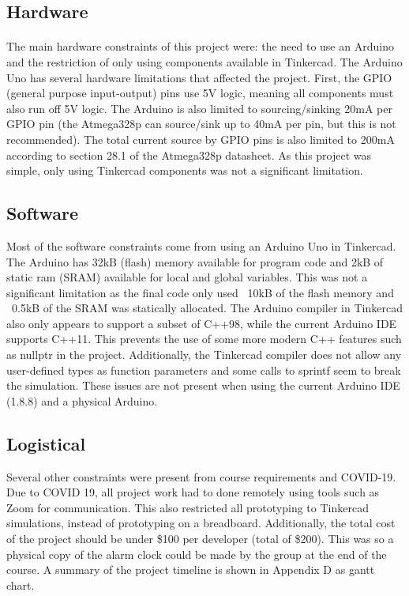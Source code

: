 \documentclass{article}
\begin{document}
\subsection{Hardware}
\paragraph{}
The main hardware constraints of this project were: the need to use an Arduino and the restriction of only using components available in Tinkercad. The Arduino Uno has several hardware limitations that affected the project. First, the GPIO (general purpose input-output) pins use 5V logic\cite{arduino}, meaning all components must also run off 5V logic. The Arduino is also limited to sourcing/sinking 20mA per GPIO pin\cite{arduino} (the Atmega328p can source/sink up to 40mA per pin\cite{atmega}, but this is not recommended). The total current source by GPIO pins is also limited to 200mA according to section 28.1 of the Atmega328p datasheet\cite{atmega}. As this project was simple, only using Tinkercad components was not a significant limitation.

\subsection{Software}
Most of the software constraints come from using an Arduino Uno in Tinkercad. The Arduino has 32kB (flash) memory available for program code and 2kB of static ram (SRAM) available for local and global variables\cite{arduino}. This was not a significant limitation as the final code only used ~10kB of the flash memory and ~0.5kB of the SRAM was statically allocated. The Arduino compiler in Tinkercad also only appears to support a subset of C++98, while the current Arduino IDE supports C++11. This prevents the use of some more modern C++ features such as nullptr in the project. Additionally, the Tinkercad compiler does not allow any user-defined types as function parameters and some calls to sprintf seem to break the simulation. These issues are not present when using the current Arduino IDE (1.8.8) and a physical Arduino.

\subsection{Logistical}
Several other constraints were present from course requirements and COVID-19. Due to COVID 19, all project work had to done remotely using tools such as Zoom for communication. This also restricted all prototyping to Tinkercad simulations, instead of prototyping on a breadboard. Additionally, the total cost of the project should be under \$100 per developer (total of \$200). This was so a physical copy of the alarm clock could be made by the group at the end of the course. A summary of the project timeline is shown in Appendix D as gantt chart.
\end{document}
